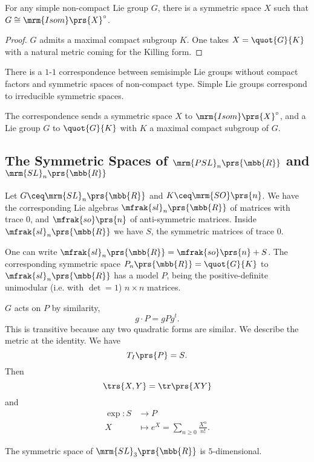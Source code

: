 \documentclass[10pt, twoside]{book}
\begin{document}
\begin{theorem}
For any simple non-compact Lie group $G$, there is a symmetric space $X$ such that $G \cong \mrm{Isom}\prs{X}^\circ$.
\end{theorem}

\begin{proof}
$G$ admits a maximal compact subgroup $K$. One takes $X = \quot{G}{K}$ with a natural metric coming for the Killing form.
\end{proof}

\begin{corollary}
There is a $1$-$1$ correspondence between semisimple Lie groups without compact factors and symmetric spaces of non-compact type.
Simple Lie groups correspond to irreducible symmetric spaces.

The correspondence sends a symmetric space $X$ to $\mrm{Isom}\prs{X}^\circ$, and a Lie group $G$ to $\quot{G}{K}$ with $K$ a maximal compact subgroup of $G$.
\end{corollary}

\subsection{The Symmetric Spaces of $\mrm{PSL}_n\prs{\mbb{R}}$ and $\mrm{SL}_n\prs{\mbb{R}}$}

Let $G \ceq \mrm{SL}_n\prs{\mbb{R}}$ and $K \ceq \mrm{SO}\prs{n}$. We have the corresponding Lie algebras $\mfrak{sl}_n\prs{\mbb{R}}$ of matrices with trace $0$, and $\mfrak{so}\prs{n}$ of anti-symmetric matrices. Inside $\mfrak{sl}_n\prs{\mbb{R}}$ we have $S$, the symmetric matrices of trace $0$. 

One can write $\mfrak{sl}_n\prs{\mbb{R}} = \mfrak{so}\prs{n} + S$.
The corresponding symmetric space $P_n\prs{\mbb{R}} = \quot{G}{K}$ to $\mfrak{sl}_n\prs{\mbb{R}}$ has a model $P$, being the positive-definite unimodular (i.e. with $\det = 1$) $n \times n$ matrices.

$G$ acts on $P$ by similarity,
\[g \cdot P = g P g^t \text{.}\]
This is transitive because any two quadratic forms are similar. We describe the metric at the identity. We have
\[T_I\prs{P} = S \text{.}\]
Then
\[\trs{X,Y} = \tr\prs{XY}\]
and
\begin{align*}
\exp \colon S &\to P \\
X &\mapsto e^X = \sum_{n \geq 0} \frac{X^n}{n!} \text{.}
\end{align*}

\begin{fact}
The symmetric space of $\mrm{SL}_3\prs{\mbb{R}}$ is $5$-dimensional.
\end{fact}
\end{document}
